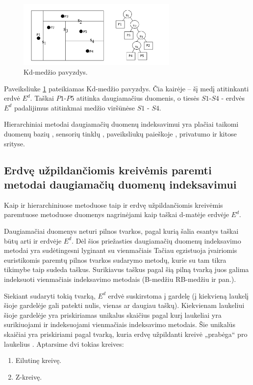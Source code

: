 \begin{figure}[H]
\begin{center}
\includegraphics[width=0.7\textwidth]{img/KdTreeExample.png}
\caption{Kd-medžio pavyzdys.}
\label{img:KdTreeExample}
\end{center}
\end{figure}

Paveiksliuke \ref{img:KdTreeExample} pateikiamas Kd-medžio pavyzdys.
Čia kairėje -- šį medį atitinkanti erdvė $E^d$.
Taškai $P1$-$P5$ atitinka daugiamačius duomenis, o tiesės $S1$-$S4$ - erdvės $E^d$ padalijimus atitinkmai medžio viršūnėse $S1$ - $S4$.

Hierarchiniai metodai daugiamačių duomenų indeksavimui yra plačiai taikomi duomenų bazių \cite{bohm2001searching}, sensorių tinklų \cite{li2003multi}, paveiksliukų paieškoje \cite{silpa2008optimised}, privatumo \cite{hore2012secure} \cite{xiao2010differentially} ir kitose srityse.

\subsection{Erdvę užpildančiomis kreivėmis paremti metodai daugiamačių duomenų indeksavimui}

Kaip ir hierarchiniuose metoduose taip ir erdvę užpildančiomis kreivėmis paremtuose metoduose duomenys nagrinėjami kaip taškai d-matėje erdvėje $E^d$.

Daugiamačiai duomenys neturi pilnos tvarkos, pagal kurią šalia esantys taškai būtų arti ir erdvėje $E^d$.
Dėl šios priežasties daugiamačių duomenų indeksavimo metodai yra sudėtingesni lyginant su vienmačiais \cite{gaede1998multidimensional} \cite{bohm2001searching}
Tačiau egzistuoja įvairiomis euristikomis paremtų pilnos tvarkos sudarymo metodų, kurie su tam tikra tikimybe taip sudeda taškus.
Surikiavus taškus pagal šią pilną tvarką juos galima indeksuoti vienmačiais indeksavimo metodais (B-medžiu \cite{comer1979ubiquitous} RB-medžiu \cite{hanke1997relaxed} ir pan.).

Siekiant sudaryti tokią tvarką, $E^d$ erdvė suskirstoma į gardelę (į kiekvieną laukelį šioje gardelėje gali patekti nulis, vienas ar daugiau taškų).
Kiekvienam laukeliui šioje gardelėje yra priskiriamas unikalus skaičius pagal kurį laukeliai yra surikiuojami ir indeksuojami vienmačiais indeksavimo metodais.
Šie unikalūs skaičiai yra priskiriami pagal tvarką, kuria erdvę užpildanti kreivė „prabėga“ pro laukelius \cite{bader2012space}.
Aptarsime dvi tokias kreives:
\begin{enumerate}
	\item Eilutinę kreivę.
	\item Z-kreivę.
\end{enumerate}

